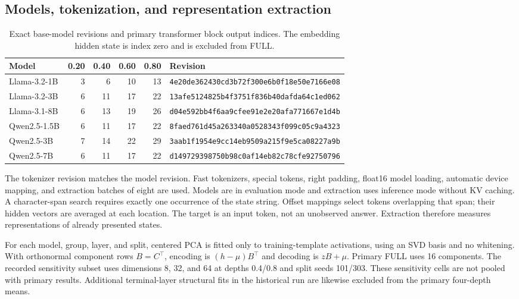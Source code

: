 \subsection{Models, tokenization, and representation extraction}
\begin{table}[h]
\centering
\caption{Exact base-model revisions and primary transformer block output indices. The embedding hidden state is index zero and is excluded from FULL.}
\label{tab:models}
\small
\begin{tabular}{lrrrrl}
\toprule
Model & 0.20 & 0.40 & 0.60 & 0.80 & Revision \\
\midrule
Llama-3.2-1B & 3&6&10&13 & \texttt{4e20de362430cd3b72f300e6b0f18e50e7166e08}\\
Llama-3.2-3B & 6&11&17&22 & \texttt{13afe5124825b4f3751f836b40dafda64c1ed062}\\
Llama-3.1-8B & 6&13&19&26 & \texttt{d04e592bb4f6aa9cfee91e2e20afa771667e1d4b}\\
Qwen2.5-1.5B & 6&11&17&22 & \texttt{8faed761d45a263340a0528343f099c05c9a4323}\\
Qwen2.5-3B & 7&14&22&29 & \texttt{3aab1f1954e9cc14eb9509a215f9e5ca08227a9b}\\
Qwen2.5-7B & 6&11&17&22 & \texttt{d149729398750b98c0af14eb82c78cfe92750796}\\
\bottomrule
\end{tabular}
\end{table}
The tokenizer revision matches the model revision. Fast tokenizers, special tokens, right padding, float16 model loading, automatic device mapping, and extraction batches of eight are used. Models are in evaluation mode and extraction uses inference mode without KV caching. A character-span search requires exactly one occurrence of the state string. Offset mappings select tokens overlapping that span; their hidden vectors are averaged at each location. The target is an input token, not an unobserved answer. Extraction therefore measures representations of already presented states.

For each model, group, layer, and split, centered PCA is fitted only to training-template activations, using an SVD basis and no whitening. With orthonormal component rows $B=C^\top$, encoding is $(h-\mu)B^\top$ and decoding is $zB+\mu$. Primary FULL uses 16 components. The recorded sensitivity subset uses dimensions 8, 32, and 64 at depths 0.4/0.8 and split seeds 101/303. These sensitivity cells are not pooled with primary results. Additional terminal-layer structural fits in the historical run are likewise excluded from the primary four-depth means.


